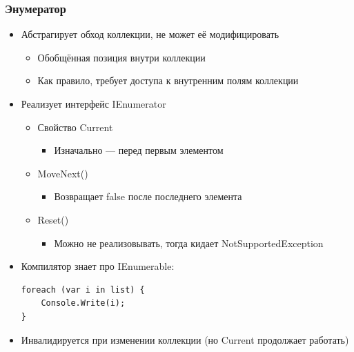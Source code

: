 \documentclass[xetex,mathserif,serif]{beamer}
\begin{document}
    \begin{frame}[fragile]
        \frametitle{Энумератор}
        \begin{itemize}
            \item Абстрагирует обход коллекции, не может её модифицировать
            \begin{itemize}
                \item Обобщённая позиция внутри коллекции
                \item Как правило, требует доступа к внутренним полям коллекции
            \end{itemize}
            \item Реализует интерфейс IEnumerator
            \begin{itemize}
                \item Свойство Current
                \begin{itemize}
                    \item Изначально --- перед первым элементом
                \end{itemize}
                \item MoveNext()
                \begin{itemize}
                    \item Возвращает false после последнего элемента
                \end{itemize}
                \item Reset()
                \begin{itemize}
                    \item Можно не реализовывать, тогда кидает NotSupportedException
                \end{itemize}
            \end{itemize}
            \item Компилятор знает про IEnumerable:
            \begin{verbatim}
foreach (var i in list) { 
    Console.Write(i); 
}
            \end{verbatim}
            \item Инвалидируется при изменении коллекции (но Current продолжает работать)
        \end{itemize}
    \end{frame}
\end{document}
